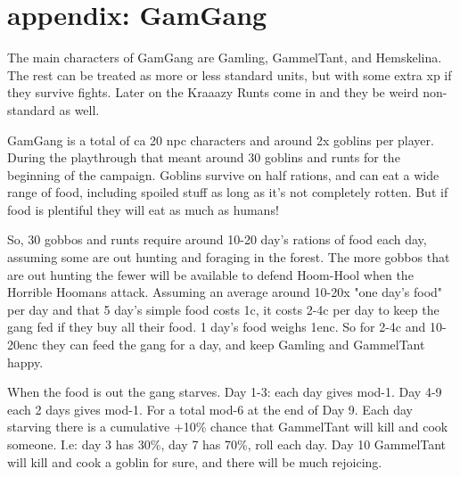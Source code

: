 \flushbottom

























\newpage
\section*{appendix: GamGang}

\raggedbottom

The main characters of GamGang are Gamling, GammelTant, and Hemskelina. The rest can be treated as more or less standard units, but with some extra xp if they survive fights. Later on the Kraaazy Runts come in and they be weird non-standard as well.

GamGang is a total of ca 20 npc characters and around 2x goblins per player. During the playthrough that meant around 30 goblins and runts for the beginning of the campaign. Goblins survive on half rations, and can eat a wide range of food, including spoiled stuff as long as it's not completely rotten. But if food is plentiful they will eat as much as humans!

So, 30 gobbos and runts require around 10-20 day's rations of food each day, assuming some are out hunting and foraging in the forest. The more gobbos that are out hunting the fewer will be available to defend Hoom-Hool when the Horrible Hoomans attack.
Assuming an average around 10-20x "one day's food" per day and that 5 day's simple food costs 1c, it costs 2-4c per day to keep the gang fed if they buy all their food. 1 day's food weighs 1enc. So for 2-4c and 10-20enc they can feed the gang for a day, and keep Gamling and GammelTant happy.

When the food is out the gang starves. Day 1-3: each day gives mod-1. Day 4-9 each 2 days gives mod-1. For a total mod-6 at the end of Day 9.
Each day starving there is a cumulative +10\% chance that GammelTant will kill and cook someone. I.e: day 3 has 30\%, day 7 has 70\%, roll each day.
Day 10 GammelTant will kill and cook a goblin for sure, and there will be much rejoicing.

